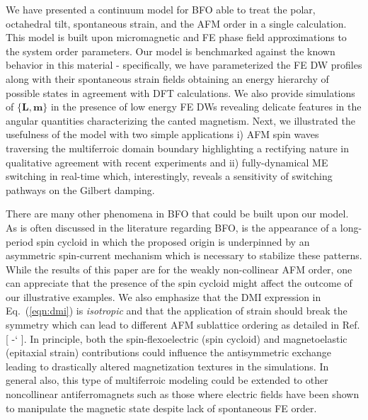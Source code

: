 \documentclass[%
 reprint,
superscriptaddress,
 amsmath,amssymb,
prb,
]{revtex4-1}
\newcommand*{\citen}[1]{%
  \begingroup
    \romannumeral-`\x %
    \setcitestyle{numbers}%
    \cite{#1}%
  \endgroup   
}
\begin{document}
%
We have presented a continuum model for BFO able to treat the polar, octahedral tilt, spontaneous strain, and the AFM order in a single calculation.
%
This model is built upon micromagnetic and FE phase field approximations to the system order parameters.
%
Our model is benchmarked against the known behavior in this material - specifically, we have parameterized the FE DW profiles along with their spontaneous strain fields obtaining an energy hierarchy of possible states in agreement with DFT calculations\cite{Dieguez2013}.
%
We also provide simulations of $\{\mathbf{L},\mathbf{m}\}$ in the presence of low energy FE DWs revealing delicate features in the angular quantities characterizing the canted magnetism.
%
Next, we illustrated the usefulness of the model with two simple applications i) AFM spin waves traversing the multiferroic domain boundary highlighting a rectifying nature in qualitative agreement with recent experiments \cite{Parsonet2022} and ii) fully-dynamical ME switching in real-time which, interestingly, reveals a sensitivity of
switching pathways on the Gilbert damping.

%
There are many other phenomena in BFO that could be built upon our model.
%
As is often discussed in the literature regarding BFO, is the appearance of a long-period spin cycloid \cite{Agbelele2017, Burns2020} in which the proposed origin is underpinned by an asymmetric spin-current mechanism\cite{Gareeva2013, Popkov2016, Xu2021, Meyer2022} which is necessary to stabilize these patterns.
%
While the results of this paper are for the weakly non-collinear AFM order, one can appreciate that the presence of the spin cycloid might affect the outcome of our illustrative examples.
%
We also emphasize that the DMI expression in Eq.~(\ref{eqn:dmi}) is \emph{isotropic} and that the application of strain should break the symmetry which can lead to different AFM sublattice ordering as detailed in Ref. [\citen{Dixit2015}].
%
In principle, both the spin-flexoelectric (spin cycloid) and magnetoelastic (epitaxial strain) contributions could influence the antisymmetric exchange leading to drastically altered magnetization textures in the simulations.
%
In general also, this type of multiferroic modeling could be extended to other noncollinear antiferromagnets such as those where electric fields have been shown to manipulate the magnetic state despite lack of spontaneous FE order\cite{He2010, Kosub2017}.
%
\end{document}
